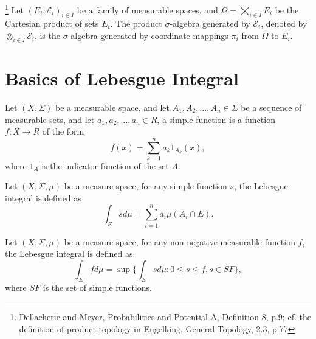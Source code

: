 \begin{definition}
\footnote{Dellacherie and Meyer, Probabilities and Potential A, Definition 8, 
p.9; cf. the definition of product topology in Engelking, General Topology,
2.3, p.77}
Let $(E_i,\mathcal{E}_i)_{i\in I}$ be a family of measurable spaces, and 
$\Omega=\bigtimes_{i\in I} E_i$ be the Cartesian product of sets $E_i$.
The product $\sigma$-algebra generated by $\mathcal{E}_i$, denoted by
$\otimes_{i\in I} \mathcal{E}_i$, is the $\sigma$-algebra generated by 
coordinate mappings $\pi_i$ from $\Omega$ to $E_i$. 
\end{definition}



\section{Basics of Lebesgue Integral}

\begin{definition}
Let $(X,\Sigma)$ be a measurable space, and let $A_1,A_2,\dots,A_n\in \Sigma$
be a sequence of measurable sets, and let $a_1,a_2,\dots,a_n\in R$, a 
simple function is a function $f:X\to R$ of the form
\begin{equation}
  f(x)= \sum_{k=1}^n a_k 1_{A_k}(x),
\end{equation}
where $1_A$ is the indicator function of the set $A$.
\end{definition}

\begin{definition}
Let $(X,\Sigma,\mu)$ be a measure space, for any simple function $s$, 
the Lebesgue integral is defined as
\begin{equation}
  \int_E s d\mu = \sum_{i=1}^n a_i \mu(A_i \cap E).
\end{equation}
\end{definition}

\begin{definition}
Let $(X,\Sigma,\mu)$ be a measure space, 
for any non-negative measurable function $f$, the Lebesgue integral is defined
as
\begin{equation}
  \int_E f d\mu = \sup \{ \int_E s d\mu: 0\le s\le f, s \in SF \},
\end{equation}
where $SF$ is the set of simple functions.
\end{definition}

